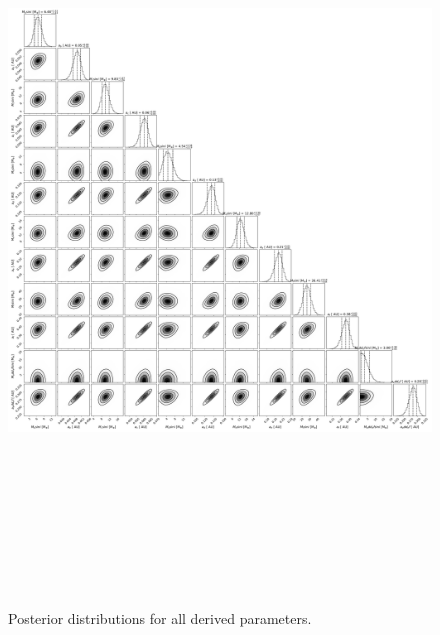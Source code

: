 \documentclass{emulateapj}
\begin{document}
\begin{figure}[!h]
\centering

\includegraphics[height=8.0in,width=6.0in,keepaspectratio]{TOI-1246_add_ef_corner_derived_pars.pdf}
\caption{Posterior distributions for all derived parameters.}
\end{figure} 

\end{document}
